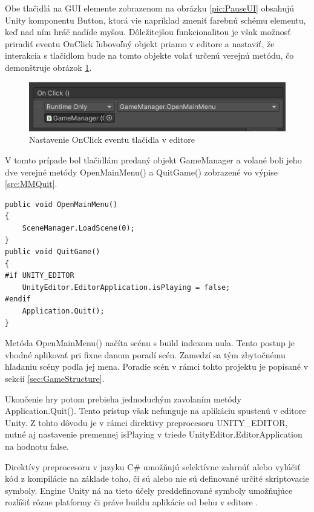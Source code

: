 \documentclass[slovak, master]{diploma}
\begin{document}
Obe tlačidlá na GUI elemente zobrazenom na obrázku \ref{pic:PauseUI} obsahujú Unity komponentu Button, ktorá vie napríklad zmeniť farebnú schému elementu, keď nad ním hráč nadíde myšou. Dôležitejšou funkcionalitou je však možnosť priradiť eventu OnClick ľubovoľný objekt priamo v editore a nastaviť, že interakcia s tlačidlom bude na tomto objekte volať určenú verejnú metódu, čo demonštruje obrázok \ref{pic:OnClick}. 

\begin{figure}[!htbp]
    \centering
    \includegraphics[width=.8\textwidth]{Figures/OnClick.png}
    \caption{Nastavenie OnClick eventu tlačidla v editore}
    \label{pic:OnClick}
\end{figure}

V tomto prípade bol tlačidlám predaný objekt GameManager a volané boli jeho dve verejné metódy OpenMainMenu() a QuitGame() zobrazené vo výpise \ref{src:MMQuit}.

\vspace{8pt}
\begin{lstlisting}[label=src:MMQuit,caption={Návrat do hlavnej ponuky a ukončenie hry}]
public void OpenMainMenu()
{
    SceneManager.LoadScene(0);
}
public void QuitGame()
{
#if UNITY_EDITOR
    UnityEditor.EditorApplication.isPlaying = false;
#endif
    Application.Quit();
}
\end{lstlisting}

Metóda OpenMainMenu() načíta scénu s build indexom nula. Tento postup je vhodné aplikovať pri fixne danom poradí scén. Zamedzí sa tým zbytočnému hľadaniu scény podľa jej mena. Poradie scén v rámci tohto projektu je popísané v sekcií \ref{sec:GameStructure}. 

Ukončenie hry potom prebieha jednoduchým zavolaním metódy Application.Quit(). Tento prístup však nefunguje na aplikáciu spustenú v editore Unity. Z tohto dôvodu je v rámci direktivy preprocesoru UNITY\_EDITOR, nutné aj nastavenie premennej isPlaying v triede UnityEditor.EditorApplication na hodnotu false. 

Direktívy preprocesoru v jazyku C\# umožňujú selektívne zahrnúť alebo vylúčiť kód z kompilácie na základe toho, či sú alebo nie sú definované určité skriptovacie symboly. Engine Unity ná na tieto účely preddefinované symboly umožňujúce rozlíšiť rôzne platformy či práve buildu aplikácie od behu v editore \cite{ConditionalCompilation}.
\end{document}
